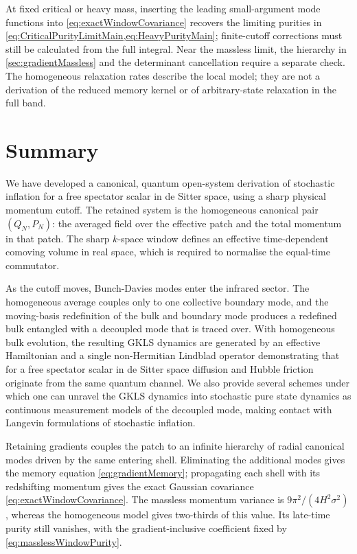 \documentclass{article}
\numberwithin{equation}{section}
\begin{document}
At fixed critical or heavy mass, inserting the leading small-argument mode functions into \cref{eq:exactWindowCovariance} recovers the limiting purities in \cref{eq:CriticalPurityLimitMain,eq:HeavyPurityMain}; finite-cutoff corrections must still be calculated from the full integral. Near the massless limit, the hierarchy in \cref{sec:gradientMassless} and the determinant cancellation require a separate check. The homogeneous relaxation rates describe the local model; they are not a derivation of the reduced memory kernel or of arbitrary-state relaxation in the full band.

	\section{Summary}
	\label{sec:Summary}

	We have developed a canonical, quantum open-system derivation of stochastic inflation for a free spectator scalar in de Sitter space, using a sharp physical momentum cutoff. The retained system is the homogeneous canonical pair \((Q_N,P_N)\): the averaged field over the effective patch and the total momentum in that patch. The sharp \(k\)-space window defines an effective time-dependent comoving volume in real space, which is required to normalise the equal-time commutator.

	As the cutoff moves, Bunch-Davies modes enter the infrared sector. The homogeneous average couples only to one collective boundary mode, and the moving-basis redefinition of the bulk and boundary mode produces a redefined bulk entangled with a decoupled mode that is traced over. With homogeneous bulk evolution, the resulting GKLS dynamics are generated by an effective Hamiltonian and a single non-Hermitian Lindblad operator demonstrating that for a free spectator scalar in de Sitter space diffusion and Hubble friction originate from the same quantum channel. We also provide several schemes under which one can unravel the GKLS dynamics into stochastic pure state dynamics as continuous measurement models of the decoupled mode, making contact with Langevin formulations of stochastic inflation.

	Retaining gradients couples the patch to an infinite hierarchy of radial canonical modes driven by the same entering shell. Eliminating the additional modes gives the memory equation \eqref{eq:gradientMemory}; propagating each shell with its redshifting momentum gives the exact Gaussian covariance \eqref{eq:exactWindowCovariance}. The massless momentum variance is $9\pi^2/(4H^2\sigma^2)$, whereas the homogeneous model gives two-thirds of this value. Its late-time purity still vanishes, with the gradient-inclusive coefficient fixed by \cref{eq:masslessWindowPurity}.
\end{document}
